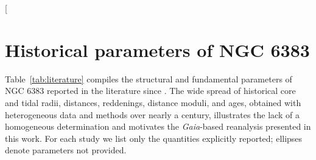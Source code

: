 \documentclass{aa}
\begin{document}

 

\begin{appendix}
\nolinenumbers
\setlength{\floatsep}{8pt plus 2pt minus 2pt}
\setlength{\dblfloatsep}{8pt plus 2pt minus 2pt}
\setlength{\intextsep}{8pt plus 2pt minus 2pt}

\makeatletter
\def\@captype{table}
\makeatother
\twocolumn[{%
\section{Historical parameters of NGC 6383}\label{app:historical}

Table~\ref{tab:literature} compiles the structural and fundamental parameters of NGC 6383 reported in the literature since \citet{1930LicOB..14..154T}. The wide spread of historical core and tidal radii, distances, reddenings, distance moduli, and ages, obtained with heterogeneous data and methods over nearly a century, illustrates the lack of a homogeneous determination and motivates the \textit{Gaia}-based reanalysis presented in this work. For each study we list only the quantities explicitly reported; ellipses denote parameters not provided.

}
\end{appendix}
\end{document}
